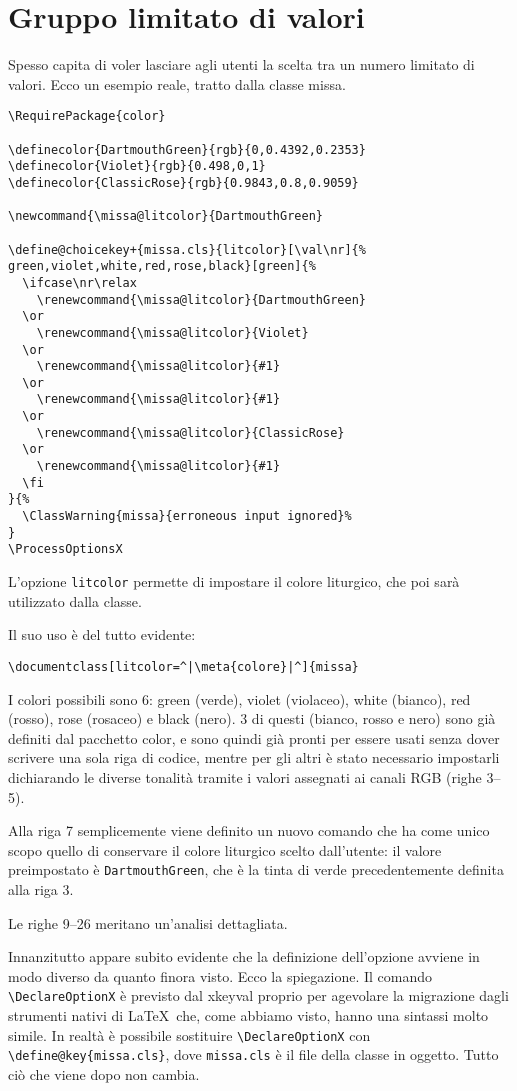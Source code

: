 \documentclass{scrartcl}
\newcommand{\meta}[1]{$\langle$\textit{#1}$\rangle$}
\begin{document}
\section{Gruppo limitato di valori}
\label{sec:gruppo}
Spesso capita di voler lasciare agli utenti la scelta tra un numero limitato di valori. Ecco un esempio reale, tratto dalla classe missa.
\begin{lstlisting}
\RequirePackage{color}

\definecolor{DartmouthGreen}{rgb}{0,0.4392,0.2353}
\definecolor{Violet}{rgb}{0.498,0,1}
\definecolor{ClassicRose}{rgb}{0.9843,0.8,0.9059}

\newcommand{\missa@litcolor}{DartmouthGreen}

\define@choicekey+{missa.cls}{litcolor}[\val\nr]{%
green,violet,white,red,rose,black}[green]{%
  \ifcase\nr\relax
    \renewcommand{\missa@litcolor}{DartmouthGreen}
  \or
    \renewcommand{\missa@litcolor}{Violet}
  \or
    \renewcommand{\missa@litcolor}{#1}
  \or
    \renewcommand{\missa@litcolor}{#1}
  \or
    \renewcommand{\missa@litcolor}{ClassicRose}
  \or
    \renewcommand{\missa@litcolor}{#1}
  \fi
}{%
  \ClassWarning{missa}{erroneous input ignored}%
}
\ProcessOptionsX
\end{lstlisting}

L'opzione \lstinline+litcolor+ permette di impostare il colore liturgico, che poi sarà utilizzato dalla classe.

Il suo uso è del tutto evidente:
\begin{lstlisting}
\documentclass[litcolor=^|\meta{colore}|^]{missa}
\end{lstlisting}

I colori possibili sono 6: green (verde), violet (violaceo), white (bianco), red (rosso), rose (rosaceo) e black (nero). 3 di questi (bianco, rosso e nero) sono già definiti dal pacchetto color, e sono quindi già pronti per essere usati senza dover scrivere una sola riga di codice, mentre per gli altri è stato necessario impostarli dichiarando le diverse tonalità tramite i valori assegnati ai canali RGB (righe 3--5).

Alla riga 7 semplicemente viene definito un nuovo comando che ha come unico scopo quello di conservare il colore liturgico scelto dall'utente: il valore preimpostato è \lstinline+DartmouthGreen+, che è la tinta di verde precedentemente definita alla riga 3.

Le righe 9--26 meritano un'analisi dettagliata.

Innanzitutto appare subito evidente che la definizione dell'opzione avviene in modo diverso da quanto finora visto. Ecco la spiegazione. Il comando \lstinline+\DeclareOptionX+ è previsto dal xkeyval proprio per agevolare la migrazione dagli strumenti nativi di \LaTeX\ che, come abbiamo visto, hanno una sintassi molto simile. In realtà è possibile sostituire \lstinline+\DeclareOptionX+ con \lstinline+\define@key{missa.cls}+, dove \lstinline+missa.cls+ è il file della classe in oggetto. Tutto ciò che viene dopo non cambia.
\end{document}
